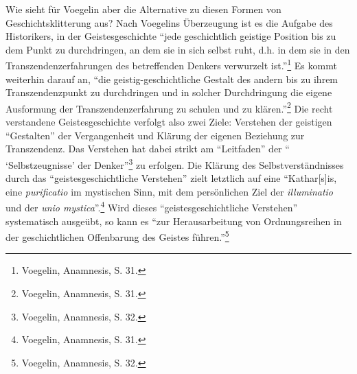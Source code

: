 Wie sieht für Voegelin aber die Alternative zu diesen Formen von
Geschichtsklitterung aus? Nach Voegelins Überzeugung ist es die Aufgabe des
Historikers, in der Geistesgeschichte "`jede geschichtlich geistige Position
bis zu dem Punkt zu durchdringen, an dem sie in sich selbst ruht, d.h. in dem
sie in den Transzendenzerfahrungen des betreffenden Denkers verwurzelt
ist."'\footnote{Voegelin, Anamnesis, S. 31.} Es kommt weiterhin darauf an,
"`die geistig-geschichtliche Gestalt des andern bis zu ihrem Transzendenzpunkt
zu durchdringen und in solcher Durchdringung die eigene Ausformung der
Transzendenzerfahrung zu schulen und zu klären."'\footnote{Voegelin,
  Anamnesis, S. 31.} Die recht verstandene Geistesgeschichte verfolgt also
zwei Ziele: Verstehen der geistigen "`Gestalten"' der Vergangenheit und
Klärung der eigenen Beziehung zur Transzendenz. \label{Selbstzeugnisse1} Das
Verstehen hat dabei strikt am "`Leitfaden"' der "` `Selbstzeugnisse' der
Denker"'\footnote{Voegelin, Anamnesis, S. 32.} zu erfolgen. Die Klärung des
Selbstverständnisses durch das "`geistesgeschichtliche Verstehen"' zielt
letztlich auf eine "`Kathar[s]is, eine {\it purificatio} im mystischen Sinn,
mit dem persönlichen Ziel der {\it illuminatio} und der {\it unio
  mystica}"'.\footnote{Voegelin, Anamnesis, S. 31.}  Wird dieses
"`geistesgeschichtliche Verstehen"' systematisch ausgeübt, so kann es "`zur
Herausarbeitung von Ordnungsreihen in der geschichtlichen Offenbarung des
Geistes führen."'\footnote{Voegelin, Anamnesis, S. 32.}


